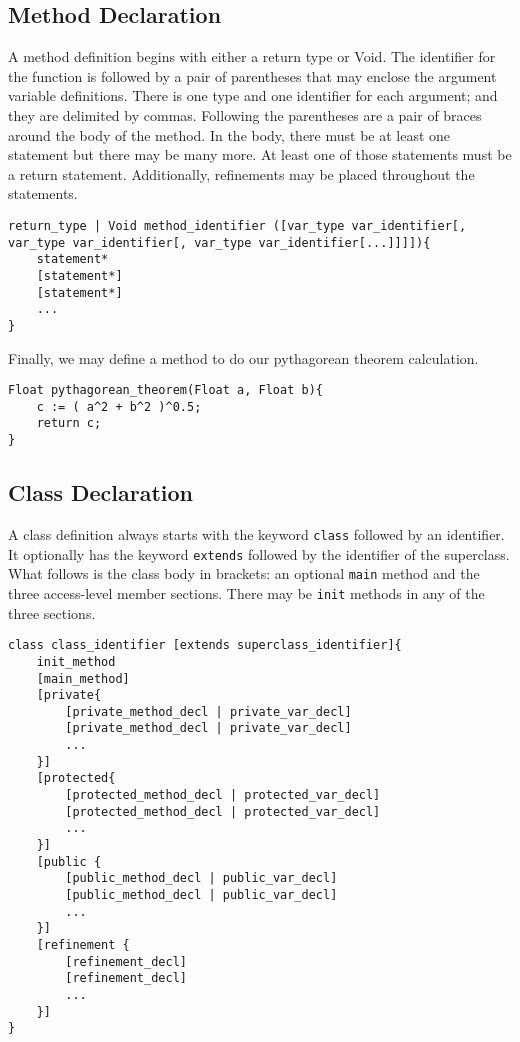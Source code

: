 \subsection{Method Declaration}
A method definition begins with either a return type or Void. The identifier for the function is followed by a pair of parentheses that may enclose the argument variable definitions. There is one type and one identifier for each argument; and they are delimited by commas. Following the parentheses are a pair of braces around the body of the method. In the body, there must be at least one statement but there may be many more. At least one of those statements must be a return statement. Additionally, refinements may be placed throughout the statements.
 
\begin{lstlisting}
return_type | Void method_identifier ([var_type var_identifier[, var_type var_identifier[, var_type var_identifier[...]]]]){
	statement*
	[statement*]
	[statement*]
	...
}
\end{lstlisting}

Finally, we may define a method to do our pythagorean theorem calculation.

\begin{lstlisting}[label=Method Invocation,caption=Method Definition for the Pythagorean Theorem]
Float pythagorean_theorem(Float a, Float b){
	c := ( a^2 + b^2 )^0.5;
	return c;
}
\end{lstlisting}

\subsection{Class Declaration}
A class definition always starts with the keyword \verb!class! followed by an identifier. It optionally has the keyword \verb!extends! followed by the identifier of the superclass. What follows is the class body in brackets: an optional \verb!main! method and the three access-level member sections. There may be \verb!init! methods in any of the three sections.

\begin{lstlisting}
class class_identifier [extends superclass_identifier]{
	init_method
	[main_method]
	[private{
		[private_method_decl | private_var_decl]
		[private_method_decl | private_var_decl]
		...
	}]
	[protected{
		[protected_method_decl | protected_var_decl]
		[protected_method_decl | protected_var_decl]
		...
	}]
	[public {
		[public_method_decl | public_var_decl]
		[public_method_decl | public_var_decl]
		...
	}]
	[refinement {
		[refinement_decl]
		[refinement_decl]
		...
	}]
}
\end{lstlisting}

